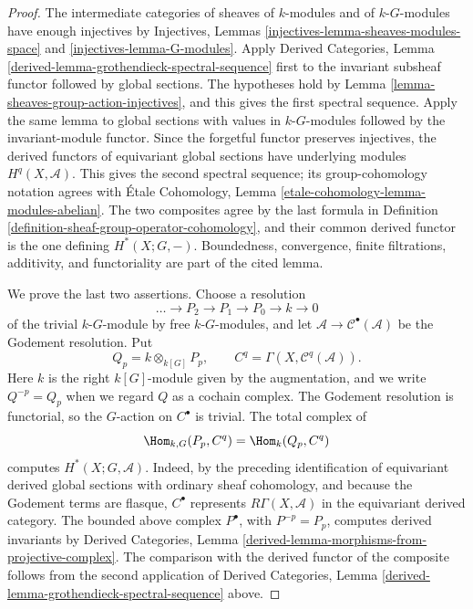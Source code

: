 \begin{proof}
The intermediate categories of sheaves of $k$-modules and of
$k\text{-}G$-modules have enough injectives by Injectives, Lemmas
\ref{injectives-lemma-sheaves-modules-space} and
\ref{injectives-lemma-G-modules}.
Apply Derived Categories, Lemma
\ref{derived-lemma-grothendieck-spectral-sequence} first to the invariant
subsheaf functor followed by global sections. The hypotheses hold by Lemma
\ref{lemma-sheaves-group-action-injectives}, and this gives the first
spectral sequence. Apply the same lemma to global sections with values in
$k\text{-}G$-modules followed by the invariant-module functor. Since the
forgetful functor preserves injectives, the derived functors of equivariant
global sections have underlying modules $H^q(X, \mathcal{A})$. This gives
the second spectral sequence; its group-cohomology notation agrees with
\'Etale Cohomology, Lemma
\ref{etale-cohomology-lemma-modules-abelian}. The two composites agree by the last formula
in Definition \ref{definition-sheaf-group-operator-cohomology}, and their
common derived functor is the one defining $H^*(X; G, -)$. Boundedness,
convergence, finite filtrations, additivity, and functoriality are part of
the cited lemma.

We prove the last two assertions. Choose a resolution
$$
\ldots \longrightarrow P_2 \longrightarrow P_1 \longrightarrow
P_0 \longrightarrow k \longrightarrow 0
$$
of the trivial $k\text{-}G$-module by free $k\text{-}G$-modules, and let
$\mathcal{A} \to \mathcal{C}^\bullet(\mathcal{A})$ be the Godement
resolution. Put
$$
Q_p = k \otimes_{k[G]} P_p,
\qquad
C^q = \Gamma(X, \mathcal{C}^q(\mathcal{A})).
$$
Here $k$ is the right $k[G]$-module given by the augmentation, and we write
$Q^{-p} = Q_p$ when we regard $Q$ as a cochain complex.
The Godement resolution is functorial, so the $G$-action on $C^\bullet$ is
trivial. The total complex of
$$
\Hom_{k, G}(P_p, C^q) = \Hom_k(Q_p, C^q)
$$
computes $H^*(X; G, \mathcal{A})$. Indeed, by the preceding identification
of equivariant derived global sections with ordinary sheaf cohomology, and
because the Godement terms are flasque, $C^\bullet$ represents
$R\Gamma(X, \mathcal{A})$ in the equivariant derived category. The bounded above
complex $P^\bullet$, with $P^{-p} = P_p$, computes derived invariants by
Derived Categories, Lemma
\ref{derived-lemma-morphisms-from-projective-complex}. The comparison with
the derived functor of the composite follows from the second application of
Derived Categories, Lemma
\ref{derived-lemma-grothendieck-spectral-sequence} above.


\end{proof}
